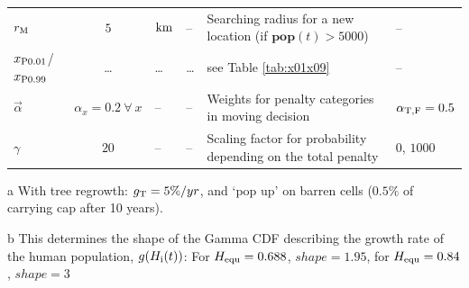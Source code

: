\begin{threeparttable}
\begin{tabular}{P|S|H|Q|M|P}
 $r_{\rm M}$ & $5$ & ${\rm km}$ & -- & Searching radius for a new location (if $\mathbf{pop}(t)>5000$) & -- \\

$x_{\rm P0.01}$/$x_{\rm P0.99}$ & \ldots & \ldots & \ldots & see Table \ref{tab:x01x09} & -- \\
 $\vec{\alpha}$ & $\alpha_x=0.2 \ \forall \ x$ & -- & -- & Weights for penalty categories in moving decision & $\alpha_{\rm T,F} = 0.5$ \\
 $\gamma$ & $20$ & -- & -- & Scaling factor for probability depending on the total penalty &  $0$, $1000$\\
\end{tabular}
	\begin{tablenotes}
	\item[a] With tree regrowth: $g_{\rm T} = 5\%/yr$, and `pop up' on barren cells ($0.5\%$ of carrying cap after 10 years).
	\item[b] This determines the shape of the Gamma CDF describing the growth rate of the human population, $g(H_{\rm i}(t))$: For $H_{\rm equ}=0.688$, $shape = 1.95$, for  $H_{\rm equ}=0.84$, $shape = 3$
\end{tablenotes}
\end{threeparttable}

